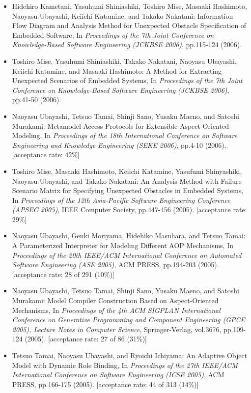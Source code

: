 \documentclass{article}
\begin{document}
\begin{itemize}
\item Hidehiro Kametani, Yasuhumi Shiniashiki, Toshiro Mise, Masaaki Hashimoto, Naoyasu Ubayashi, Keiichi Katamine, and Takako Nakatani:
Information Flow Diagram and Analysis Method for Unexpected Obstacle Specification of Embedded Software,
In {\em Proceedings of the 7th Joint Conference on Knowledge-Based Software Engineering (JCKBSE 2006)},
pp.115-124 (2006).

\item Toshiro Mise, Yasuhumi Shiniashiki, Takako Nakatani, Naoyasu Ubayashi, Keiichi Katamine, and Masaaki Hashimoto:
A Method for Extracting Unexpected Scenarios of Embedded Systems,
In {\em Proceedings of the 7th Joint Conference on Knowledge-Based Software Engineering (JCKBSE 2006)},
pp.41-50 (2006).

\item Naoyasu Ubayashi, Tetsuo Tamai, Shinji Sano, Yusaku Maeno, and Satoshi Murakami:
Metamodel Access Protocols for Extensible Aspect-Oriented Modeling,
In {\em Proceedings of the 18th International Conference on Software Engineering and Knowledge Engineering (SEKE 2006)},
pp.4-10 (2006).
[acceptance rate: 42\%]

\item Toshiro Mise, Masaaki Hashimoto, Keiichi Katamine, Yasufumi Shinyashiki, Naoyasu Ubayashi, and Takako Nakatani:
An Analysis Method with Failure Scenario Matrix for Specifying Unexpected Obstacles in Embedded Systems,
In {\em Proceedings of the 12th Asia-Pacific Software Engineering Conference (APSEC 2005)},
IEEE Computer Society,
pp.447-456 (2005).
[acceptance rate: 29\%]

\item Naoyasu Ubayashi, Genki Moriyama, Hidehiko Masuhara, and Tetsuo Tamai:
A Parameterized Interpreter for Modeling Different AOP Mechanisms,
In {\em Proceedings of the 20th IEEE/ACM International Conference on Automated Software Engineering (ASE 2005)},
ACM PRESS,
pp.194-203 (2005).
[acceptance rate: 28 of 291 (10\%)]

\item Naoyasu Ubayashi, Tetsuo Tamai, Shinji Sano, Yusaku Maeno, and Satoshi Murakami:
Model Compiler Construction Based on Aspect-Oriented Mechanisms,
In {\em Proceedings of the 4th ACM SIGPLAN International Conference on Generative Programming and Component Engineering (GPCE 2005),
Lecture Notes in Computer Science}, Springer-Verlag, vol.3676,
pp.109-124 (2005).
[acceptance rate: 27 of 86 (31\%)]

\item Tetsuo Tamai, Naoyasu Ubayashi, and Ryoichi Ichiyama:
An Adaptive Object Model with Dynamic Role Binding,
In {\em Proceedings of the 27th IEEE/ACM International Conference on Software Engineering (ICSE 2005)},
ACM PRESS,
pp.166-175 (2005).
[acceptance rate: 44 of 313 (14\%)]


\end{itemize}
\end{document}
